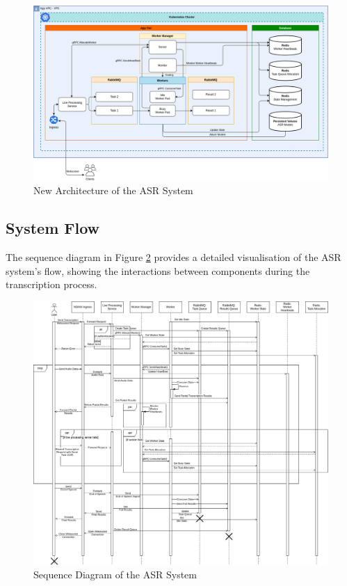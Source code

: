 \begin{figure}[!h]
    \centering
    \includegraphics[width=\textwidth]{figures/new_architecture.drawio.png}
    \caption{New Architecture of the ASR System}
    \label{fig:new_architecture}
\end{figure}

\subsection{System Flow}
The sequence diagram in Figure \ref{fig:sequence_diagram} provides a detailed visualisation of the ASR system's flow, showing the interactions between components during the transcription process.

\clearpage

\begin{figure}[ht]
    \centering
    \includegraphics[width=\textwidth]{figures/sequence_diagram.drawio.png}
    \caption{Sequence Diagram of the ASR System}
    \label{fig:sequence_diagram}
\end{figure}

